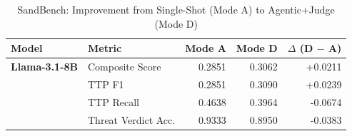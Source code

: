 \begin{table}[ht]
\centering
\caption{SandBench: Improvement from Single-Shot (Mode A) to Agentic+Judge (Mode D)}
\label{tab:improvement_delta}
\begin{tabular}{llrrr}
\toprule
Model & Metric & Mode A & Mode D & $\Delta$ (D $-$ A) \\
\midrule
\textbf{Llama-3.1-8B} & Composite Score & 0.2851 & 0.3062 & +0.0211 \\
 & TTP F1 & 0.2851 & 0.3090 & +0.0239 \\
 & TTP Recall & 0.4638 & 0.3964 & -0.0674 \\
 & Threat Verdict Acc. & 0.9333 & 0.8950 & -0.0383 \\
\bottomrule
\end{tabular}
\end{table}